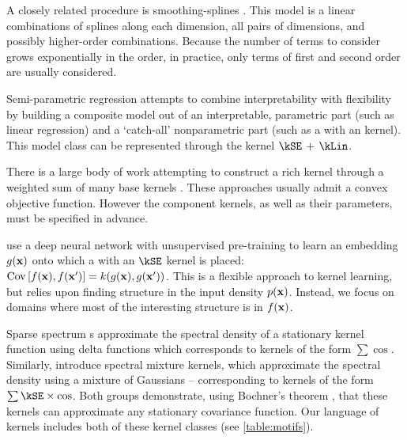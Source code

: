 A closely related procedure is smoothing-splines \ANOVA{} \citep{wahba1990spline, gu2002smoothing}.
This model is a linear combinations of splines along each dimension, all pairs of dimensions, and possibly higher-order combinations.
Because the number of terms to consider grows exponentially in the order, in practice, only terms of first and second order are usually considered.

Semi-parametric regression \citep[e.g.][]{ruppert2003semiparametric} attempts to combine interpretability with flexibility by building a composite model out of an interpretable, parametric part (such as linear regression) and a `catch-all' nonparametric part (such as a \gp{} with an \kSE{} kernel).
This model class can be represented through the kernel ${\kSE \kernplus \kLin}$.


There is a large body of work attempting to construct a rich kernel through a weighted sum of many base kernels \citep[e.g.][]{gonen2011multiple, Bach_HKL}.
These approaches usually admit a convex objective function.
However the component kernels, as well as their parameters, must be specified in advance.


\citet{salakhutdinov2008using} use a deep neural network with unsupervised pre-training to learn an embedding $g({\bf{x}})$ onto which a \gp{} with an $\kSE$ kernel is placed: ${\operatorname{Cov}{[f({\bf{x}}), f({\bf{x}}')]} = k(g({\bf{x}}), g({\bf{x}}'))}$.
This is a flexible approach to kernel learning, but relies upon finding structure in the input density $p({\bf{x}})$.
Instead, we focus on domains where most of the interesting structure is in $f({\bf{x}})$.

Sparse spectrum \gp{}s \citep{lazaro2010sparse} approximate the spectral density of a stationary kernel function using delta functions which corresponds to kernels of the form $\sum \cos$.
Similarly, \citet{WilAda13} introduce spectral mixture kernels, which approximate the spectral density using a mixture of Gaussians -- corresponding to kernels of the form $\sum \kSE \times \cos$.
Both groups demonstrate, using Bochner's theorem \citep{bochner1959lectures}, that these kernels can approximate any stationary covariance function.
Our language of kernels includes both of these kernel classes (see \cref{table:motifs}).

